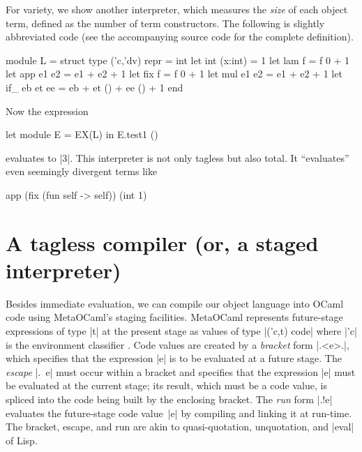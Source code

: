 \documentclass[preprint]{sigplanconf}
\begin{document}
For variety, we show another interpreter, which measures the \emph{size}
of each object term, defined as the number of term
constructors. The following is slightly abbreviated code (see the
accompanying source code for the complete definition).
\begin{code}
module L = struct
  type ('c,'dv) repr = int
  let int (x:int)  = 1
  let lam f        = f 0 + 1
  let app e1 e2    = e1 + e2 + 1
  let fix f        = f 0 + 1
  let mul e1 e2    = e1 + e2 + 1
  let if_ eb et ee = eb + et () + ee () + 1
end
\end{code}
Now the expression
\begin{code}
let module E = EX(L) in E.test1 ()
\end{code}
evaluates to |3|. This interpreter is not only tagless but also
total. It ``evaluates'' even seemingly divergent terms like
\begin{code}
app (fix (fun self -> self)) (int 1)
\end{code}

\begin{comment}
module EX1(S: Symantics) = struct
 open S
 let tfix () = app (fix (fun self -> self)) (int 1)
end;;
let module E =EX1(R) in E.tfix ();;
let module E =EX1(L) in E.tfix ();;
\end{comment}

\section{A tagless compiler (or, a staged interpreter)}\label{compiler}

Besides immediate evaluation, we can compile our object language
into OCaml code using MetaOCaml's staging facilities. MetaOCaml
represents future-stage expressions of type |t| at the
present stage as values of type |('c,t) code| where |'c| is the
environment classifier \citep{WalidPOPL03,calcagno-ml-like}. Code values are created
by a \emph{bracket} form |.<e>.|, which specifies that the expression |e| is to be
evaluated at a future stage. The \emph{escape} |.~e| must occur
within a bracket and specifies that the expression |e| must be evaluated
at the current stage; its result, which must be a code value, is
spliced into the code being built by the enclosing bracket. The \emph{run} form |.!e| evaluates
the future-stage code value~|e| by compiling and linking it at run-time.
The bracket, escape, and run are akin to
quasi-quotation, unquotation, and |eval| of Lisp.
\end{document}
